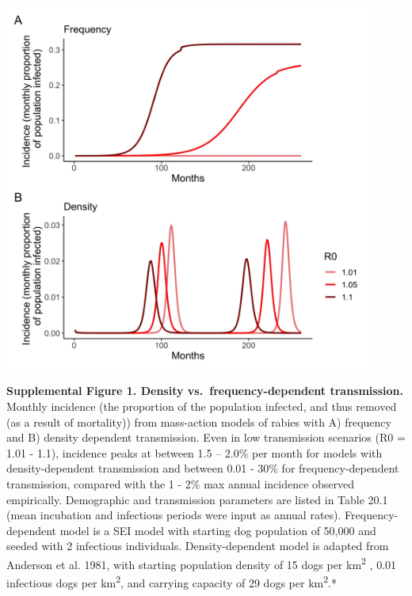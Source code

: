 \documentclass[
]{book}
\begin{document}
\includegraphics[width=4.76923in,height=4.76923in]{figs/ch3/image4.jpeg}

\textbf{Supplemental Figure 1. Density vs.~frequency-dependent
transmission.}
Monthly incidence (the proportion of the population
infected, and thus removed (as a result of mortality)) from mass-action
models of rabies with A) frequency and B) density dependent
transmission. Even in low transmission scenarios (R0 = 1.01 - 1.1),
incidence peaks at between 1.5 -- 2.0\% per month for models with
density-dependent transmission and between 0.01 - 30\% for
frequency-dependent transmission, compared with the 1 - 2\% max annual
incidence observed empirically. Demographic and transmission parameters
are listed in Table 20.1 (mean incubation and infectious periods were
input as annual rates). Frequency-dependent model is a SEI model with
starting dog population of 50,000 and seeded with 2 infectious
individuals. Density-dependent model is adapted from Anderson et al.
1981, with starting population density of 15 dogs per km\textsuperscript{2} , 0.01
infectious dogs per km\textsuperscript{2}, and carrying capacity of 29 dogs per km\textsuperscript{2}.*
\end{document}
